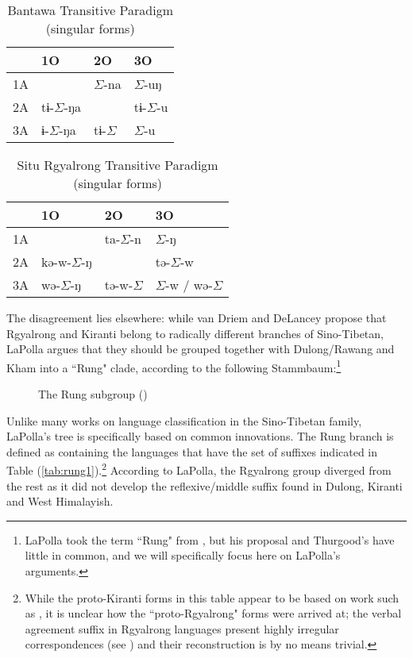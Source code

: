\documentclass[oldfontcommands,oneside,a4paper,11pt]{article}
\newcommand{\grise}[1]{\cellcolor{lightgray}\textbf{#1}}
\newcommand{\ra}{$\Sigma$}
\begin{document}
 \begin{table}[H]
 \caption{Bantawa Transitive Paradigm (singular forms)} \centering \label{tab:bantawa}
 \begin{tabular}{l|l|l|l|}
  &1O&2O&3O\\
 \hline
1A & 	\grise{} & 	\ra{}-na & 	\ra{}-uŋ \\ 
2A & 	tɨ-\ra{}-ŋa & 	\grise{}	 & 	tɨ-\ra{}-u \\ 
3A & 	ɨ-\ra{}-ŋa & 	tɨ-\ra{} & 	\ra{}-u \\ 
 \hline
\end{tabular}
\end{table}

 \begin{table}[H]
 \caption{Situ Rgyalrong Transitive Paradigm (singular forms)} \centering \label{tab:situ}
 \begin{tabular}{l|l|l|l|}
  &1O&2O&3O\\
 \hline
1A & 	\grise{} & 	ta-\ra{}-n & 	\ra{}-ŋ \\ 
2A & 	kə-w-\ra{}-ŋ & 	\grise{}	 & 	tə-\ra{}-w \\ 
3A & 	wə-\ra{}-ŋ & 	tə-w-\ra{} & 	\ra{}-w / wə-\ra{}\\ 
 \hline
\end{tabular}
\end{table}


The  disagreement lies elsewhere: while van Driem and DeLancey propose that Rgyalrong and Kiranti belong to radically different branches of Sino-Tibetan, LaPolla argues that they should be grouped together with Dulong/Rawang and Kham into a ``Rung" clade, according to the following Stammbaum:\footnote{LaPolla took the term ``Rung" from \citet{thurgood85pro} , but his proposal and Thurgood's have little in common, and we will specifically focus here on LaPolla's arguments. }
\begin{figure}[H]
\caption{The Rung subgroup (\citealt[394]{lapolla05st})} \label{fig:rung}
\begin{newicktree}
  \small
  \setunitlength{20cm} \righttree \nobranchlengths \nodelabelformat{}
  \par %
\end{newicktree}
\end{figure}

Unlike many works on language classification in the Sino-Tibetan family, LaPolla's tree is specifically based on   common innovations. The Rung branch is defined as containing the languages that have the set of suffixes indicated in Table (\ref{tab:rung1}).\footnote{While the proto-Kiranti forms in this table appear to be based on  work such as \citet{driem93agreement}, it is unclear how the ``proto-Rgyalrong" forms  were arrived at; the verbal agreement suffix in Rgyalrong languages present highly irregular correspondences (see \citealt{gongxun14agreement}) and their reconstruction is by no means trivial. } According to LaPolla, the Rgyalrong group diverged from the rest as it did not develop the reflexive/middle suffix found in Dulong, Kiranti and West Himalayish.
\end{document}
